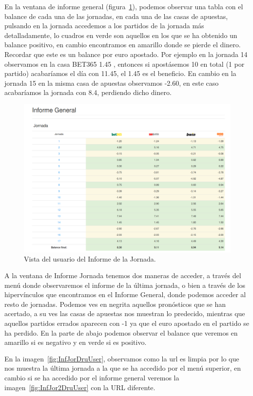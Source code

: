En la ventana de informe general (figura~\ref{fig:InfGenDruUser}), podemos observar  una tabla con el balance de cada una de las jornadas, en cada una de las casas de apuestas, pulsando en la jornada accedemos a los partidos de la jornada más detalladamente, lo cuadros en verde son aquellos en los que se ha obtenido un balance positivo, en cambio encontramos en amarillo donde se pierde el dinero. Recordar que este es un balance por euro apostado. Por ejemplo en la jornada 14 observamos en la casa BET365 1.45 , entonces si apostásemos 10 en total (1 por partido) acabaríamos el día con 11.45, el 1.45 es el beneficio. En cambio en la jornada 15 en la misma casa de apuestas observamos -2.60, en este caso acabaríamos la jornada con 8.4, perdiendo dicho dinero.

\begin{figure}
\centering
\includegraphics[width=.9\textwidth]{img/drupal_inf_general_usuario}
\caption{Vista del usuario del Informe de la Jornada.}
\label{fig:InfGenDruUser}
\end{figure}

A la ventana de Informe Jornada tenemos dos maneras de acceder, a través del menú donde observaremos el informe de la última jornada, o bien a través de los hipervínculos que encontramos en el Informe General, donde podemos acceder al resto de jornadas.
Podemos ves en negrita aquellos pronósticos que se han acertado, a su ves las casas de apuestas nos muestran lo predecido, mientras que aquellos partidos errados aparecen con -1 ya que el euro apostado en el partido se ha perdido. En la parte de abajo podemos observar el balance que veremos en amarillo si es negativo y en verde si es positivo.

En la imagen~\ref{fig:InfJorDruUser}, observamos como la url es limpia por lo que nos muestra la última jornada a la que se ha accedido por el menú superior, en cambio si se ha accedido por el informe general veremos la imagen~\ref{fig:InfJor2DruUser} con la URL diferente.

